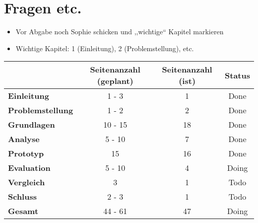 \section*{Fragen etc.}
    \begin{itemize}
        \item Vor Abgabe noch Sophie schicken und ,,wichtige`` Kapitel markieren
        \item Wichtige Kapitel: 1 (Einleitung), 2 (Problemstellung), etc.
    \end{itemize}
\begin{table}[H]
\centering
\begin{tabular}{l|c|c|c}
                               & \textbf{Seitenanzahl (geplant)} & \textbf{Seitenanzahl (ist)} & \textbf{Status}        \\ \hline
\textbf{Einleitung}            & 1 - 3                           & {\color{green} 1}          & {\color{green} Done}    \\ \hline
\textbf{Problemstellung}       & 1 - 2                           & {\color{green} 2}           & {\color{green} Done}   \\ \hline
\textbf{Grundlagen}            & 10 - 15                         & {\color{green} 18}         & {\color{green} Done}    \\ \hline
\textbf{Analyse}               & 5 - 10                          & {\color{green} 7}           & {\color{green} Done}   \\ \hline
\textbf{Prototyp}              & 15                              & {\color{green} 16}         & {\color{green} Done}    \\ \hline
\textbf{Evaluation}            & 5 - 10                          & {\color{red} 4}             & {\color{yellow} Doing} \\ \hline
\textbf{Vergleich}             & 3                               & {\color{red} 1}             & {\color{red} Todo}     \\ \hline
\textbf{Schluss}               & 2 - 3                           & {\color{red} 1}             & {\color{red} Todo}     \\ \hline
\textbf{Gesamt}                & 44 - 61                         & {\color{green} 47}         & {\color{yellow} Doing}  \\
\end{tabular}
\end{table}